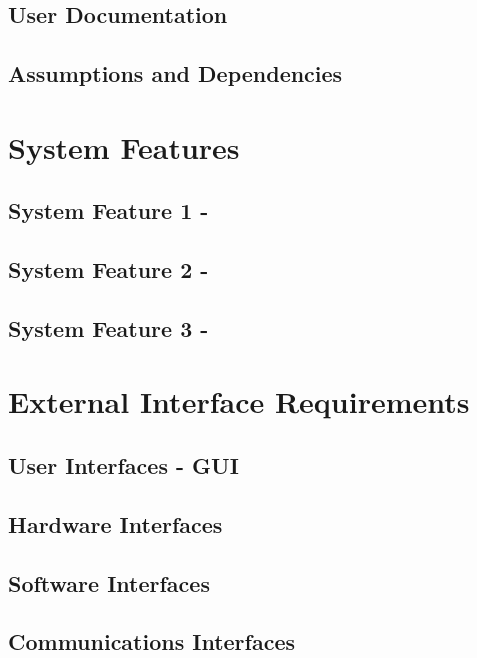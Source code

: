 \documentclass[10pt, a4paper, onecolumn]{scrartcl}
\begin{document}
		\subsection{User Documentation}
		
		\subsection{Assumptions and Dependencies}
	
	\section{System Features}
	
		\subsection{System Feature 1 - }
		
		\subsection{System Feature 2 - }
		
		\subsection{System Feature 3 - }
	
	\section{External Interface Requirements}
	
		\subsection{User Interfaces - GUI}
		
		\subsection{Hardware Interfaces}
		
		\subsection{Software Interfaces}
		
		\subsection{Communications Interfaces}
	
\end{document}
